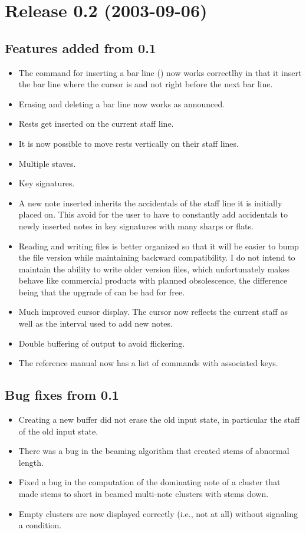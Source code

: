 \section{Release 0.2 (2003-09-06)}

\subsection{Features added from 0.1}

\begin{itemize}
\item The command for inserting a bar line (\kbd{|}) now works
  correctlhy in that it insert the bar line where the cursor is and
  not right before the next bar line.
\item Erasing and deleting a bar line now works as announced.
\item Rests get inserted on the current staff line. 
\item It is now possible to move rests vertically on their staff
  lines. 
\item Multiple staves.
\item Key signatures.
\item A new note inserted inherits the accidentals of the staff line
  it is initially placed on.  This avoid for the user to have to
  constantly add accidentals to newly inserted notes in key signatures
  with many sharps or flats.
\item Reading and writing {\gs} files is better organized so that it
  will be easier to bump the file version while maintaining backward
  compatibility.  I do not intend to maintain the ability to write
  older version files, which unfortunately makes {\gs} behave like
  commercial products with planned obsolescence, the difference being
  that the upgrade of {\gs} can be had for free.
\item Much improved cursor display.  The cursor now reflects the
  current staff as well as the interval used to add new notes.
\item Double buffering of output to avoid flickering.
\item The reference manual now has a list of commands with associated
  keys. 
\end{itemize}

\subsection{Bug fixes from 0.1}
\begin{itemize}
\item Creating a new buffer did not erase the old input state, in
  particular the staff of the old input state. 
\item There was a bug in the beaming algorithm that created stems of
  abnormal length. 
\item Fixed a bug in the computation of the dominating note of a
  cluster that made stems to short in beamed multi-note clusters with
  stems down.
\item Empty clusters are now displayed correctly (i.e., not at all)
  without signaling a condition. 
\end{itemize}

